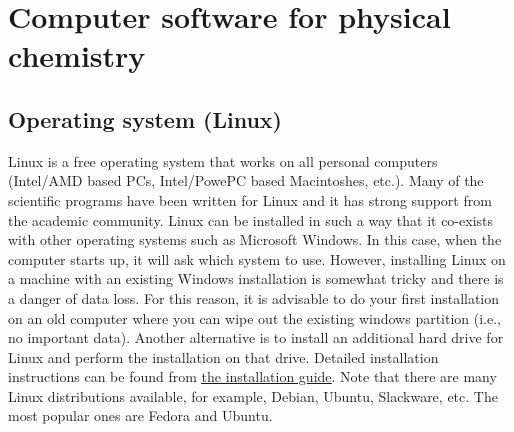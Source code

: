 \documentclass[byrevtex,amssymb,aps,pra,floatfix,letterpaper]{revtex4}
\begin{document}







\section{Computer software for physical chemistry}
\label{sec9}

\subsection{Operating system (Linux)}
\label{sec9.1}

Linux is a free operating system that works on all personal computers (Intel/AMD based PCs, Intel/PowePC based Macintoshes, etc.). Many of the scientific programs have been written for Linux and it has strong support from the academic community. Linux can be installed in such a way that it co-exists with other operating systems such as Microsoft Windows. In this case, when the computer starts up, it will ask which system to use. However, installing Linux on a machine with an existing Windows installation is somewhat tricky and there is a danger of data loss. For this reason, it is advisable to do your first installation on an old computer where you can wipe out the existing windows partition (i.e., no important data). Another alternative is to install an additional hard drive for Linux and perform the installation on that drive. Detailed installation instructions can be found from \href{http://docs.fedoraproject.org/}{\underline{the installation guide}}. Note that there are many Linux distributions available, for example, Debian, Ubuntu, Slackware, etc. The most popular ones are Fedora and Ubuntu.
\end{document}
